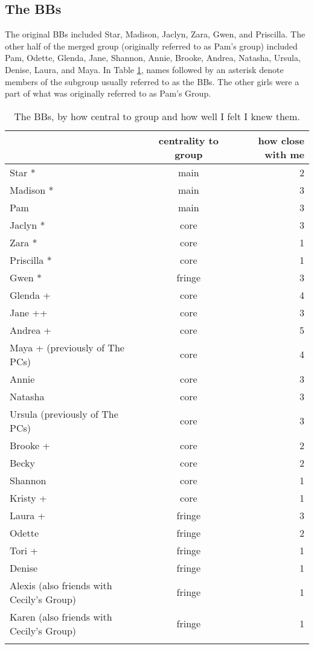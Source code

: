\pagebreak
\subsection {The BBs}
\nopagebreak
The original BBs in\-cluded Star, Ma\-di\-son, Ja\-clyn, Za\-ra, Gwen, and Pris\-cil\-la.  The other half of the merged group (originally referred to as Pam's group) included Pam, Odette, Glenda, Jane, Shannon, Annie, Brooke, Andrea, Natasha, Ursula, Denise, Laura, and Maya.  In Table \ref{BBnames}, names followed by an asterisk denote members of the subgroup usually referred to as the BBs.  The other girls were a part of what was originally referred to as Pam's Group.
\begin{table}[H]
\caption{The BBs, by how central to group and how well I felt I knew them.}	\label{BBnames}
	\centering
		\begin{tabular}{lcr}
		\lsptoprule
			\multirow{2}{*}{\sc name} & \multicolumn{1}{p{2cm}}{\centering \sc centrality to group} & \multicolumn{1}{p{1.75cm}}{\centering \sc how close with me}  \\
		\midrule
			
			Star * 		&		main	&		2 \\
			Madison *	&		main	&		3 \\
			Pam			&		main	&		3 \\
			Jaclyn *	&		core	&		3 \\
			Zara *	&		core	&		1 \\
			Priscilla * & core	&		1 \\
			Gwen *		&		fringe &	3 \\
			Glenda +	&		core	&		4 \\
			Jane ++		&		core	&	3 \\
			Andrea + & core & 5 \\
			Maya + (previously of The PCs) & core & 4 \\
			Annie & core & 3 \\
			Natasha & core & 3 \\
			Ursula (previously of The PCs) & core & 3 \\
			Brooke + & core & 2 \\
			Becky & core & 2 \\
			Shannon	&	core	& 1 \\
			Kristy + & core & 1 \\
			Laura + & fringe & 3 \\
			Odette	&		fringe	&	2 \\
			Tori  +  & fringe  & 1 \\
			Denise & fringe & 1 \\
			Alexis (also friends with Cecily's Group) & fringe & 1 \\
			Karen (also friends with Cecily's Group) & fringe & 1 \\
	   \lspbottomrule
		\end{tabular}
\end{table}


